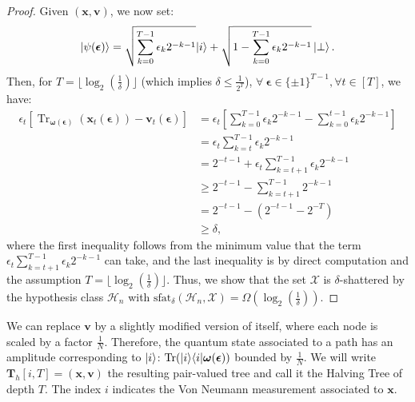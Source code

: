 \begin{proof}
    
Given $(\mathbf x,\mathbf v)$, we now set:
\begin{equation}
    \ket{\psi(\boldsymbol\epsilon)}=\sqrt{\sum_{k=0}^{T-1}\epsilon_{k}2^{-k-1}}| i \rangle+\sqrt{1-\sum_{k=0}^{T-1}\epsilon_{k}2^{-k-1}}\ket{\perp}.
\end{equation}
    Then, for $T=\lfloor\operatorname{log}_2(\frac1\delta)\rfloor$ (which implies $\delta\le\frac1{2^T}$), $\forall \ \boldsymbol{\epsilon} \in \{\pm 1\}^{T-1}, \forall t \in [T]$, we have:
    \begin{align}
    \label{eq:halving_proof}
        \epsilon_t [\operatorname{Tr}_{ \boldsymbol\omega(\boldsymbol \epsilon)}(\mathbf{x}_t(\boldsymbol{\epsilon})) - \mathbf{v}_t (\boldsymbol{\epsilon})] 
        &= \epsilon_t \left[\sum_{k=0}^{T-1}\epsilon_{k}2^{-k-1}-\sum_{k=0}^{t-1}\epsilon_{k}2^{-k-1}\right]
        \nonumber\\&=\epsilon_t\sum_{k=t}^{T-1}\epsilon_{k}2^{-k-1}\nonumber\\&=2^{-t-1}+\epsilon_t\sum_{k=t+1}^{T-1}\epsilon_{k}2^{-k-1}\nonumber\\&\geq2^{-t-1}-\sum_{k=t+1}^{T-1}2^{-k-1}\nonumber\\&=2^{-t-1}-(2^{-t-1}-2^{- T})
        \nonumber\\&\geq \delta,
    \end{align}
    where the first inequality follows from the minimum value that the term $\epsilon_t\sum_{k=t+1}^{T-1}\epsilon_{k}2^{-k-1}\nonumber$ can take, and the last inequality is by direct computation and the assumption $T=\lfloor\operatorname{log}_2(\frac1\delta)\rfloor$. Thus, we show that the set $\mathcal{X}$ is $\delta$-shattered by the hypothesis class $\mathcal{H}_n$ with $\text{sfat}_\delta (\mathcal{H}_n, \mathcal{X}) = \Omega(\log_2(\frac1\delta))$. %
\end{proof}

We can replace $\mathbf{v}$ by a slightly modified version of itself, where each node is scaled by a factor $\frac1N$. Therefore, the quantum state associated to a path  has an amplitude corresponding to $| i \rangle$: $\operatorname{Tr}(| i \rangle \langle i | \boldsymbol\omega(\boldsymbol\epsilon))$ bounded by $\frac1N$. We will write $\mathbf{T}_h [i, T]=(\mathbf x,\mathbf v)$ the resulting pair-valued tree and call it the Halving Tree of depth $T$. The index $i$ indicates the Von Neumann measurement associated to $\mathbf{x}$.

